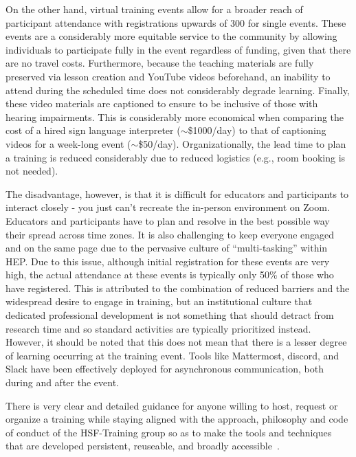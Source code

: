 \documentclass[twocolumn]{svjour3}          %
\begin{document}
On the other hand, virtual training events allow for a broader reach of participant attendance with registrations upwards of 300 for single events.  These events are a considerably more equitable service to the community by allowing individuals to participate fully in the event regardless of funding, given that there are no travel costs. Furthermore, because the teaching materials are fully preserved via lesson creation and YouTube videos beforehand, an inability to attend during the scheduled time does not considerably degrade learning.  Finally, these video materials are captioned to ensure to be inclusive of those with hearing impairments. This is considerably more economical when comparing the cost of a hired sign language interpreter ($\sim$\$1000/day) to that of captioning videos for a week-long event ($\sim$\$50/day). Organizationally, the lead time to plan a training is reduced considerably due to reduced logistics (e.g., room booking is not needed).

The disadvantage, however, is that it is difficult for educators and participants to interact closely - you just can’t recreate the in-person environment on Zoom. Educators and participants have to plan and resolve in the best possible way their spread across time zones. It is also challenging to keep everyone engaged and on the same page due to the pervasive culture of \enquote{multi-tasking} within HEP. Due to this issue, although initial registration for these events are very high, the actual attendance at these events is typically only 50\% of those who have registered.
This is attributed to the combination of reduced barriers and the widespread desire to engage in training, but an institutional culture that dedicated professional development is not something that should detract from research time and so standard activities are typically prioritized instead.  However, it should be noted that this does not mean that there is a lesser degree of learning occurring at the training event. Tools like Mattermost, discord, and Slack have been effectively deployed for asynchronous communication, both during and after the event.

There is very clear and detailed guidance for anyone willing to host, request or organize a training while staying aligned with the approach, philosophy and code of conduct of the HSF-Training group so as to make the tools and techniques that are developed persistent, reuseable, and broadly accessible~\cite{HSF-training-how-to}.
%
\end{document}

